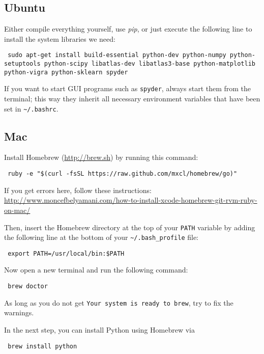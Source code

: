 \documentclass{../uebungsblatt}
\begin{document}
\subsection*{Ubuntu}

Either compile everything yourself, use \emph{pip}, or just execute the following 
line to install the system libraries we need:

\begin{lstlisting}
 sudo apt-get install build-essential python-dev python-numpy python-setuptools python-scipy libatlas-dev libatlas3-base python-matplotlib python-vigra python-sklearn spyder
\end{lstlisting}

If you want to start GUI programs such as \texttt{spyder}, always start
them from the terminal; this way they inherit all necessary environment
variables that have been set in \texttt{\~{}/.bashrc}.

\subsection*{Mac}
Install Homebrew (\url{http://brew.sh}) by running this command:
\begin{lstlisting}
 ruby -e "$(curl -fsSL https://raw.github.com/mxcl/homebrew/go)"
\end{lstlisting}

If you get errors here, follow these instructions: \\
\url{http://www.moncefbelyamani.com/how-to-install-xcode-homebrew-git-rvm-ruby-on-mac/}

Then, insert the Homebrew directory at the top of your \texttt{PATH} variable by 
adding the following line at the bottom of your \texttt{\~{}/.bash\_profile} file:
\begin{lstlisting}
 export PATH=/usr/local/bin:$PATH
\end{lstlisting}

Now open a new terminal and run the following command:
\begin{lstlisting}
 brew doctor
\end{lstlisting}

As long as you do not get \texttt{Your system is ready to brew}, try to fix the warnings.

In the next step, you can install Python using Homebrew via 
\begin{lstlisting}
 brew install python
\end{lstlisting}
\end{document}
